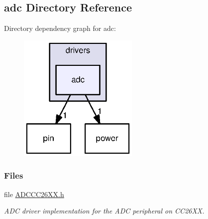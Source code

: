 \subsection{adc Directory Reference}
\label{dir_455f0d8600ae758e1782f4bf08bfb248}
Directory dependency graph for adc\+:
\nopagebreak
\begin{figure}[H]
\begin{center}
\leavevmode
\includegraphics[width=163pt]{dir_455f0d8600ae758e1782f4bf08bfb248_dep}
\end{center}
\end{figure}
\subsubsection*{Files}
\begin{DoxyCompactItemize}
\item 
file \hyperlink{_a_d_c_c_c26_x_x_8h}{A\+D\+C\+C\+C26\+X\+X.\+h}
\begin{DoxyCompactList}\small\item\em A\+D\+C driver implementation for the A\+D\+C peripheral on C\+C26\+X\+X. \end{DoxyCompactList}\end{DoxyCompactItemize}
